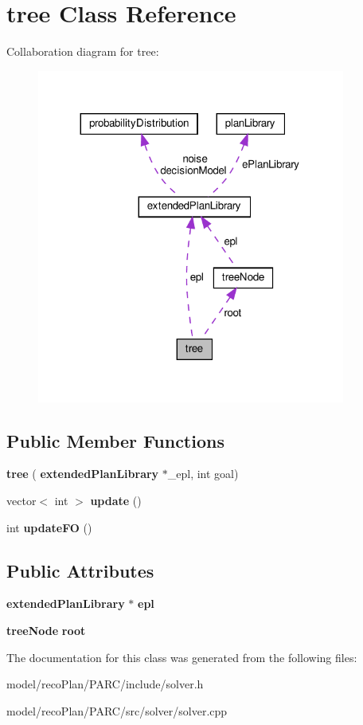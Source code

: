 \section{tree Class Reference}
\label{classtree}


Collaboration diagram for tree\+:
\nopagebreak
\begin{figure}[H]
\begin{center}
\leavevmode
\includegraphics[width=287pt]{classtree__coll__graph}
\end{center}
\end{figure}
\subsection*{Public Member Functions}
\begin{DoxyCompactItemize}
\item 
\mbox{\label{classtree_a0ba809234501e7d0c9c5f97b178197c3}} 
{\bfseries tree} (\textbf{ extended\+Plan\+Library} $\ast$\+\_\+epl, int goal)
\item 
\mbox{\label{classtree_a3fada58a662386dbbb039eb106d35838}} 
vector$<$ int $>$ {\bfseries update} ()
\item 
\mbox{\label{classtree_af560bd89e9c3e894526a66c030dab3ea}} 
int {\bfseries update\+FO} ()
\end{DoxyCompactItemize}
\subsection*{Public Attributes}
\begin{DoxyCompactItemize}
\item 
\mbox{\label{classtree_a97066a8b966d6a0163696626f9ab2f16}} 
\textbf{ extended\+Plan\+Library} $\ast$ {\bfseries epl}
\item 
\mbox{\label{classtree_a268bedd9b37b4f6a09818cc612973d2d}} 
\textbf{ tree\+Node} {\bfseries root}
\end{DoxyCompactItemize}


The documentation for this class was generated from the following files\+:\begin{DoxyCompactItemize}
\item 
model/reco\+Plan/\+P\+A\+R\+C/include/solver.\+h\item 
model/reco\+Plan/\+P\+A\+R\+C/src/solver/solver.\+cpp\end{DoxyCompactItemize}
